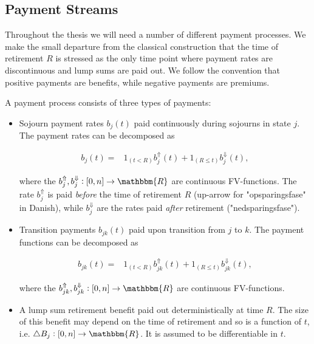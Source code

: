 \documentclass{article}
\newcommand{\1}[1]{\mathbbm{1}_{\left\lbrace #1 \right\rbrace}}
\theoremstyle{break}
\theoremstyle{remark}
\numberwithin{equation}{section}
\begin{document}
\subsection{Payment Streams}

Throughout the thesis we will need a number of different payment processes. We make the small departure from the classical construction that the time of retirement $R$ is stressed as the only time point where payment rates are discontinuous and lump sums are paid out. We follow the convention that positive payments are benefits, while negative payments are premiums.

A payment process consists of three types of payments:

\begin{itemize}
    \item Sojourn payment rates $b_j(t)$ paid continuously during sojourns in state $j$. The payment rates can be decomposed as
    
    \begin{align*}
        b_j(t) =& 1_{\left( t<R \right)} b_j^{\Uparrow}(t) + 1_{\left( R \leq t \right)} b_j^{\Downarrow}(t),
    \end{align*}
    
    where the $b_j^{\Uparrow}, b_j^{\Downarrow}: [0,n] \to \mathbbm{R}$ are continuous FV-functions. The rate $b_j^{\Uparrow}$ is paid \textit{before} the time of retirement $R$ (up-arrow for "opsparingsfase" in Danish), while $b_j^{\Downarrow}$ are the rates paid \textit{after} retirement ("nedsparingsfase").
    
    
    
    \item Transition payments $b_{jk}(t)$ paid upon transition from $j$ to $k$. The payment functions can be decomposed as
    
    \begin{align*}
        b_{jk}(t) =& 1_{\left( t<R \right)} b_{jk}^{\Uparrow}(t) + 1_{\left( R \leq t \right)} b_{jk}^{\Downarrow}(t),
    \end{align*}
    
    where the $b_{jk}^{\Uparrow}, b_{jk}^{\Downarrow}: [0,n] \to \mathbbm{R}$ are continuous FV-functions.
    
    
    
    \item A lump sum retirement benefit paid out deterministically at time $R$. The size of this benefit may depend on the time of retirement and so is a function of $t$, i.e. $\triangle B_j: [0,n] \to \mathbbm{R}$. It is assumed to be differentiable in $t$.
\end{itemize}
\end{document}
